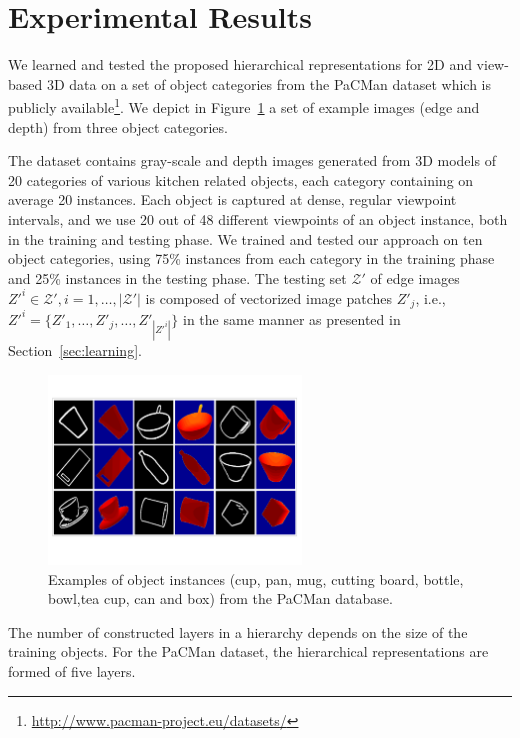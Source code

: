 \documentclass[runningheads]{llncs}
\begin{document}
\section{Experimental Results}
\label{sec:results}

We learned and tested the proposed hierarchical representations for 2D and view-based 3D data on a set of object categories from the PaCMan dataset which is publicly available\footnote{\url{http://www.pacman-project.eu/datasets/}}. We depict in Figure~\ref{database} a set of example images (edge and depth) from three object categories. 

The dataset contains gray-scale and depth images generated from 3D models of 20 categories of various kitchen related objects, each category containing on average 20 instances. Each object is captured at dense, regular viewpoint intervals, and we use 20 out of 48 different viewpoints of an object instance, both in the training and testing phase. We trained and tested our approach on ten object categories, using 75\% instances from each category in the training phase and 25\% instances in the testing phase. The testing set $\mathcal{Z'}$ of edge images $Z'^i \in \mathcal{Z'}, i=1,\ldots,|\mathcal{Z'}|$ is composed of vectorized image patches $Z'_j$, i.e., $Z'^i=\{Z'_1,\ldots,Z'_j,\ldots,Z'_{|Z'^i|}\}$ in the same manner as presented in Section~\ref{sec:learning}.

\begin{figure}
\begin{center}
\includegraphics[clip, trim=0.5cm 3.2cm 0.5cm 2.5cm, width=0.6\textwidth]{database_pacman}
\end{center}
\caption{Examples of object instances (cup, pan, mug, cutting board, bottle, bowl,tea cup, can and box) from the PaCMan database.}
\label{database}
\end{figure}

The number of constructed layers in a hierarchy depends on the size of the training objects. For the PaCMan dataset, the hierarchical representations are formed of five layers. 
\end{document}
